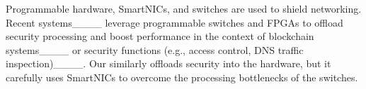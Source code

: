 
 Programmable hardware, SmartNICs, and switches are used to shield networking. Recent systems____ leverage programmable switches and FPGAs to offload security processing and boost performance in the context of blockchain systems____ or security functions (e.g., access control, DNS traffic inspection)____. Our \projecttitle{} similarly offloads security into the hardware, but it carefully uses SmartNICs to overcome the processing bottlenecks of the switches.